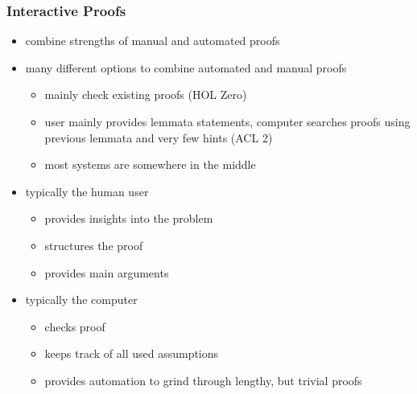 \begin{frame}
\frametitle{Interactive Proofs}

\begin{itemize}
\item combine strengths of manual and automated proofs
\item many different options to combine automated and manual proofs
\begin{itemize}
\item mainly check existing proofs (\eg HOL Zero)
\item user mainly provides lemmata statements, computer searches proofs using previous lemmata and very few hints (\eg ACL 2)
\item most systems are somewhere in the middle
\end{itemize}

\item typically the human user 
\begin{itemize}
\item provides insights into the problem
\item structures the proof
\item provides main arguments
\end{itemize}
\item typically the computer
\begin{itemize}
\item checks proof
\item keeps track of all used assumptions
\item provides automation to grind through lengthy, but trivial proofs
\end{itemize}
\end{itemize}
\end{frame}



